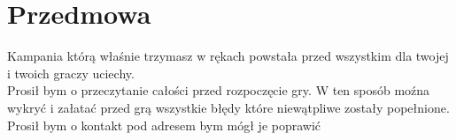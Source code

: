 \chapter{Przedmowa}

Kampania którą właśnie trzymasz
w rękach powstała przed wszystkim
dla twojej i twoich graczy uciechy.\\
Prosił bym o przeczytanie całości przed rozpoczęcie gry.
W ten sposób moźna wykryć i załatać przed grą wszystkie
błędy które niewątpliwe zostały popełnione. Prosił bym
o kontakt pod adresem  bym mógł je
poprawić
